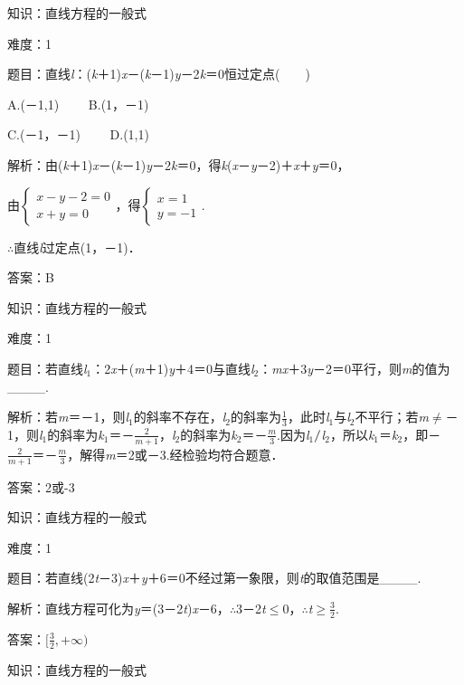 \documentclass{article} %
\begin{document}
知识：直线方程的一般式

难度：1

题目：直线\textit{l}：(\textit{k}＋1)\textit{x}－(\textit{k}－1)\textit{y}－2\textit{k}＝0恒过定点(　　)

A.(－1,1)　　  B.(1，－1)

C.(－1，－1)　　  D.(1,1)

解析：由(\textit{k}＋1)\textit{x}－(\textit{k}－1)\textit{y}－2\textit{k}＝0，得\textit{k}(\textit{x}－\textit{y}－2)＋\textit{x}＋\textit{y}＝0，

由$\left\{\begin{array}{l} x-y-2=0\\ x+y=0 \end{array}\right.$，得$\left\{\begin{array}{l} x=1\\ y=-1 \end{array}\right.$.

$\mathrm{\therefore}$直线\textit{l}过定点(1，－1)．

答案：B

知识：直线方程的一般式

难度：1

题目：若直线\textit{l}${}_{1}$：2\textit{x}＋(\textit{m}＋1)\textit{y}＋4＝0与直线\textit{l}${}_{2}$：\textit{mx}＋3\textit{y}－2＝0平行，则\textit{m}的值为\_\_\_\_.

解析：若\textit{m}＝－1，则\textit{l}${}_{1}$的斜率不存在，\textit{l}${}_{2}$的斜率为$\frac{1}{3}$，此时\textit{l}${}_{1}$与\textit{l}${}_{2}$不平行；若\textit{m}$\mathrm{\neq}$－1，则\textit{l}${}_{1}$的斜率为\textit{k}${}_{1}$＝－$\frac{2}{m+1}$，\textit{l}${}_{2}$的斜率为\textit{k}${}_{2}$＝－$\frac{m}{3}$.因为\textit{l}${}_{1}$$\mathrm{\//}$\textit{l}${}_{2}$，所以\textit{k}${}_{1}$＝\textit{k}${}_{2}$，即－$\frac{2}{m+1}$＝－$\frac{m}{3}$，解得\textit{m}＝2或－3.经检验均符合题意．

答案：2或-3

知识：直线方程的一般式

难度：1

题目：若直线(2\textit{t}－3)\textit{x}＋\textit{y}＋6＝0不经过第一象限，则\textit{t}的取值范围是\_\_\_\_.

解析：直线方程可化为\textit{y}＝(3－2\textit{t})\textit{x}－6，$\mathrm{\therefore}$3－2\textit{t}$\mathrm{\le}$0，$\mathrm{\therefore}$\textit{t}$\mathrm{\ge}\frac{3}{2}$.

答案：$[\frac{3}{2}, +\infty)$

知识：直线方程的一般式
\end{document}
